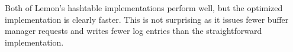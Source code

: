 \documentclass[10pt,letterpaper,twocolumn,english]{article}
\newcommand{\yad}{Lemon\xspace}
\newcommand{\eab}[1]{\textcolor{red}{\bf EAB: #1}}
\begin{document}
Both of \yad's hashtable implementations perform well, but the
optimized implementation is clearly faster.  This is not surprising as
it issues fewer buffer manager requests and writes fewer log entries
than the straightforward implementation.





\end{document}
